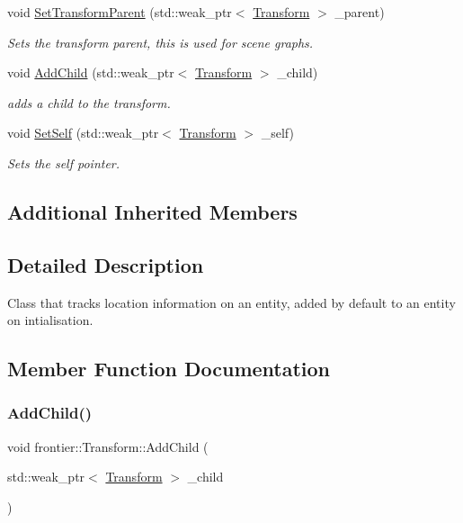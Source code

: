 \begin{DoxyCompactItemize}
void \hyperlink{classfrontier_1_1_transform_a95b6b6407a5ece2e6b188c2e1c2294a2}{Set\+Transform\+Parent} (std\+::weak\+\_\+ptr$<$ \hyperlink{classfrontier_1_1_transform}{Transform} $>$ \+\_\+parent)
\begin{DoxyCompactList}\small\item\em Sets the transform parent, this is used for scene graphs. \end{DoxyCompactList}\item 
void \hyperlink{classfrontier_1_1_transform_a61510be91275313808daa938af87f119}{Add\+Child} (std\+::weak\+\_\+ptr$<$ \hyperlink{classfrontier_1_1_transform}{Transform} $>$ \+\_\+child)
\begin{DoxyCompactList}\small\item\em adds a child to the transform. \end{DoxyCompactList}\item 
void \hyperlink{classfrontier_1_1_transform_a10e72a1e49de0c3c3a36f920612a39ce}{Set\+Self} (std\+::weak\+\_\+ptr$<$ \hyperlink{classfrontier_1_1_transform}{Transform} $>$ \+\_\+self)
\begin{DoxyCompactList}\small\item\em Sets the self pointer. \end{DoxyCompactList}\end{DoxyCompactItemize}
\subsection*{Additional Inherited Members}


\subsection{Detailed Description}
Class that tracks location information on an entity, added by default to an entity on intialisation. 

\subsection{Member Function Documentation}
\mbox{\label{classfrontier_1_1_transform_a61510be91275313808daa938af87f119}} 
\subsubsection{\texorpdfstring{Add\+Child()}{AddChild()}}
{\footnotesize\ttfamily void frontier\+::\+Transform\+::\+Add\+Child (\begin{DoxyParamCaption}\item[{std\+::weak\+\_\+ptr$<$ \hyperlink{classfrontier_1_1_transform}{Transform} $>$}]{\+\_\+child }\end{DoxyParamCaption})}



